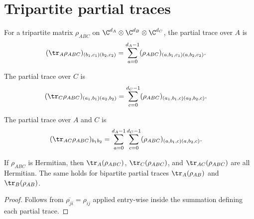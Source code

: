 \section{Tripartite partial traces}

\begin{definition}\label{def:traceA_ABC}
    \leanok
    For a tripartite matrix $\rho_{ABC}$ on
    $\C^{d_A} \otimes \C^{d_B} \otimes \C^{d_C}$,
    the partial trace over $A$ is
    \begin{align}
        (\tr_A \rho_{ABC})_{(b_1, c_1)(b_2, c_2)}
        &= \sum_{a=0}^{d_A - 1}
        (\rho_{ABC})_{(a, b_1, c_1)(a, b_2, c_2)}.
        \label{eq:entropy_trace_a}
    \end{align}
\end{definition}

\begin{definition}\label{def:traceC_ABC}
    \leanok
    The partial trace over $C$ is
    \begin{align}
        (\tr_C \rho_{ABC})_{(a_1, b_1)(a_2, b_2)}
        &= \sum_{c=0}^{d_C - 1}
        (\rho_{ABC})_{(a_1, b_1, c)(a_2, b_2, c)}.
        \label{eq:entropy_trace_c}
    \end{align}
\end{definition}

\begin{definition}\label{def:traceAC_ABC}
    \leanok
    The partial trace over $A$ and $C$ is
    \begin{align}
        (\tr_{AC} \rho_{ABC})_{b_1 b_2}
        &= \sum_{a=0}^{d_A - 1} \sum_{c=0}^{d_C - 1}
        (\rho_{ABC})_{(a, b_1, c)(a, b_2, c)}.
        \label{eq:entropy_trace_ac}
    \end{align}
\end{definition}

\begin{lemma}\label{lem:trace_isHermitian}
    \leanok
    If $\rho_{ABC}$ is Hermitian, then $\tr_A(\rho_{ABC})$,
    $\tr_C(\rho_{ABC})$, and $\tr_{AC}(\rho_{ABC})$ are all Hermitian.
    The same holds for bipartite partial traces $\tr_A(\rho_{AB})$ and
    $\tr_B(\rho_{AB})$.
\end{lemma}

\begin{proof}\leanok
    Follows from $\overline{\rho_{ji}} = \rho_{ij}$ applied entry-wise
    inside the summation defining each partial trace.
\end{proof}

